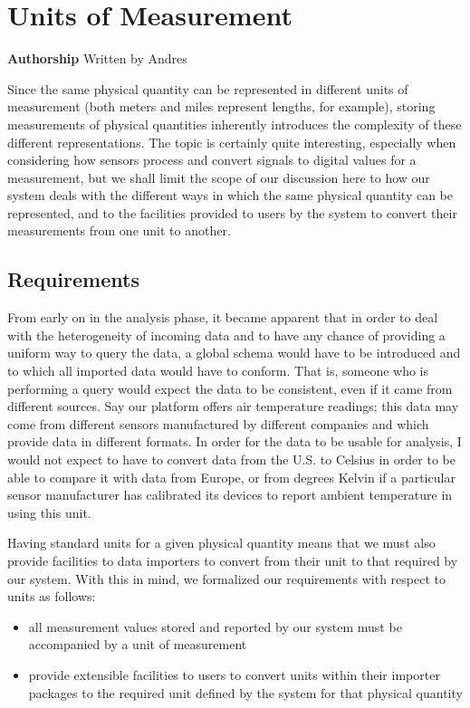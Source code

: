 \section{Units of Measurement}\label{units-of-measurement}

\textbf{Authorship} Written by Andres

Since the same physical quantity can be represented in different units
of measurement (both meters and miles represent lengths, for example),
storing measurements of physical quantities inherently introduces the
complexity of these different representations. The topic is certainly
quite interesting, especially when considering how sensors process and
convert signals to digital values for a measurement, but we shall limit
the scope of our discussion here to how our system deals with the
different ways in which the same physical quantity can be represented,
and to the facilities provided to users by the system to convert their
measurements from one unit to another.

\subsection{Requirements}\label{requirements}

From early on in the analysis phase, it became apparent that in order to
deal with the heterogeneity of incoming data and to have any chance of
providing a uniform way to query the data, a global schema would have to
be introduced and to which all imported data would have to conform. That
is, someone who is performing a query would expect the data to be
consistent, even if it came from different sources. Say our platform
offers air temperature readings; this data may come from different
sensors manufactured by different companies and which provide data in
different formats. In order for the data to be usable for analysis, I
would not expect to have to convert data from the U.S. to Celsius in
order to be able to compare it with data from Europe, or from degrees
Kelvin if a particular sensor manufacturer has calibrated its devices to
report ambient temperature in using this unit.

Having standard units for a given physical quantity means that we must
also provide facilities to data importers to convert from their unit to
that required by our system. With this in mind, we formalized our
requirements with respect to units as follows:

\begin{itemize}
\tightlist
\item
  all measurement values stored and reported by our system must be
  accompanied by a unit of measurement
\item
  provide extensible facilities to users to convert units within their
  importer packages to the required unit defined by the system for that
  physical quantity
\end{itemize}

